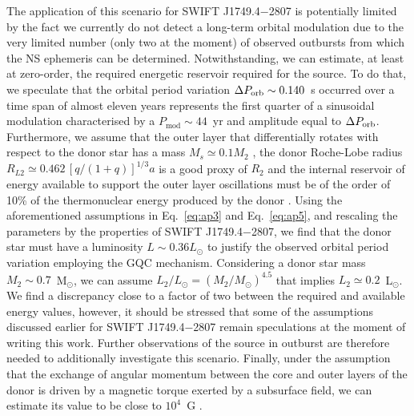 \documentclass[fleqn,usenatbib]{mnras}
\newcommand{\swiftj}{SWIFT J1749.4$-$2807}
\begin{document}
The application of this scenario for \swiftj{} is potentially limited by the fact we currently do not detect a long-term orbital modulation due to the very limited number (only two at the moment) of observed outbursts from which the NS ephemeris can be determined. Notwithstanding, we can estimate, at least at zero-order, the required energetic reservoir required for the source. To do that, we speculate that the orbital period variation $\Delta P_{\rm orb}\sim0.140$~s occurred over a time span of almost eleven years represents the first quarter of a sinusoidal modulation characterised by a $P_\text{mod}\sim 44$~yr and amplitude equal to $\Delta P_{\rm orb}$. Furthermore, we assume that the outer layer that differentially rotates with respect to the donor star has a mass $M_s\simeq 0.1 M_2$ \citep{Applegate:1994vp}, the donor  Roche-Lobe radius $R_{L2}\simeq 0.462\, [q/(1+q)]^{1/3} a$ \citep[valid for mass ratio $q\leq0.8$;][]{Paczynski71} is a good proxy of $R_2$	and the internal reservoir of energy available to support the outer layer oscillations must be of the order of 10\% of the thermonuclear energy produced by the donor \citep{Applegate:1992uh}. Using the aforementioned assumptions in Eq.~\ref{eq:ap3} and Eq.~\ref{eq:ap5}, and rescaling the parameters by the properties of \swiftj{}, we find that the donor star must have a luminosity $L\sim0.36L_\odot$ to justify the observed orbital period variation employing the GQC mechanism. Considering a donor star mass $M_2\sim0.7$~M$_\odot$, we can assume $L_2/L_\odot=(M_2/M_\odot)^{4.5}$ that implies $L_2\simeq0.2$~L$_\odot$. We find a discrepancy close to a factor of two between the required and available energy values, however, it should be stressed that some of the assumptions discussed earlier for \swiftj{} remain speculations at the moment of writing this work. Further observations of the source in outburst are therefore needed to additionally investigate this scenario.
Finally, under the assumption that the exchange of angular momentum between the core and outer layers of the donor is driven by a magnetic torque exerted by a subsurface field, we can estimate its value to be close to $10^4$~G \citep[see][equation 23]{Applegate:1992uh}.
\end{document}
